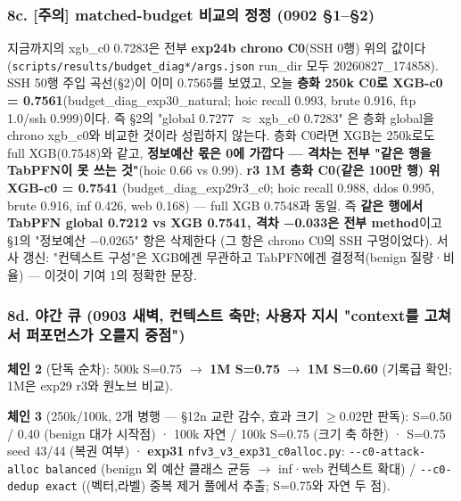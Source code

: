 \subsubsection{8c. [주의] matched-budget 비교의 정정 (0902 §1–§2)}
지금까지의 xgb\_\allowbreak{}c0 0.7283은 전부 \textbf{exp24b chrono C0}(SSH 0행) 위의 값이다 (\texttt{scripts/\allowbreak{}\allowbreak{}results/\allowbreak{}\allowbreak{}budget\_\allowbreak{}\allowbreak{}d\allowbreak{}iag*/\allowbreak{}\allowbreak{}arg\allowbreak{}s.\allowbreak{}json} run\_\allowbreak{}dir 모두 20260827\_\allowbreak{}174858). SSH 50행 주입 곡선(§2)이 이미 0.7565를 보였고, 오늘 \textbf{층화 250k C0로 XGB-c0 =\allowbreak{} 0.7561}(budget\_\allowbreak{}diag\_\allowbreak{}exp30\_\allowbreak{}natural; hoic recall 0.993, brute 0.916, ftp 1.0/\allowbreak{}ssh 0.999)이다. 즉 §2의 "global 0.7277 \ensuremath{\approx} xgb\_\allowbreak{}c0 0.7283" 은 층화 global을 chrono xgb\_\allowbreak{}c0와 비교한 것이라 성립하지 않는다. 층화 C0라면 XGB는 250k로도 full XGB(0.7548)와 같고, \textbf{정보예산 몫은 0에 가깝다 — 격차는 전부 "같은 행을 TabPFN이 못 쓰는 것"}(hoic 0.66 vs 0.99). \textbf{r3 1M 층화 C0(같은 100만 행) 위 XGB-c0 =\allowbreak{} 0.7541} (budget\_\allowbreak{}diag\_\allowbreak{}exp29r3\_\allowbreak{}c0; hoic recall 0.988, ddos 0.995, brute 0.916, inf 0.426, web 0.168) — full XGB 0.7548과 동일. 즉 \textbf{같은 행에서 TabPFN global 0.7212 vs XGB 0.7541, 격차 −0.033은 전부 method}이고 §1의 "정보예산 −0.0265" 항은 삭제한다 (그 항은 chrono C0의 SSH 구멍이었다). 서사 갱신: "컨텍스트 구성"은 XGB에겐 무관하고 TabPFN에겐 결정적(benign 질량·비율) — 이것이 기여 1의 정확한 문장.

\subsubsection{8d. 야간 큐 (0903 새벽, 컨텍스트 축만; 사용자 지시 "context를 고쳐서 퍼포먼스가 오를지 중점")}
\par\noindent \textbullet\enspace \textbf{체인 2} (단독 순차): 500k S=\allowbreak{}0.75  \ensuremath{\rightarrow}  \textbf{1M S=\allowbreak{}0.75}  \ensuremath{\rightarrow}  \textbf{1M S=\allowbreak{}0.60} (기록급 확인; 1M은 exp29 r3와 원노브 비교).


\par\noindent \textbullet\enspace \textbf{체인 3} (250k/\allowbreak{}100k, 2개 병행 — §12n 교란 감수, 효과 크기 \ensuremath{\geq}0.02만 판독): S=\allowbreak{}0.50 /\allowbreak{} 0.40 (benign 대가 시작점) · 100k 자연 /\allowbreak{} 100k S=\allowbreak{}0.75 (크기 축 하한) · S=\allowbreak{}0.75 seed 43/\allowbreak{}44 (복권 여부) · \textbf{exp31} \texttt{nfv3\_\allowbreak{}\allowbreak{}v3\_\allowbreak{}\allowbreak{}exp31\_\allowbreak{}\allowbreak{}c0\allowbreak{}alloc.\allowbreak{}py\allowbreak{}}: \texttt{-\allowbreak{}-\allowbreak{}c0-\allowbreak{}att\allowbreak{}ack-\allowbreak{}allo\allowbreak{}c balanc\allowbreak{}ed} (benign 외 예산 클래스 균등  \ensuremath{\rightarrow}  inf·web 컨텍스트 확대) /\allowbreak{} \texttt{-\allowbreak{}-\allowbreak{}c0-\allowbreak{}ded\allowbreak{}up exact\allowbreak{}} ((벡터,라벨) 중복 제거 풀에서 추출; S=\allowbreak{}0.75와 자연 두 점).


